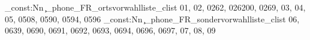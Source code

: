 \clist_const:Nn \c_phone_FR_ortsvorwahlliste_clist {01,
02,
0262,
026200,
0269,
03,
04,
05,
0508,
0590,
0594,
0596}
\clist_const:Nn \c_phone_FR_sondervorwahlliste_clist {06,
0639,
0690,
0691,
0692,
0693,
0694,
0696,
0697,
07,
08,
09}
